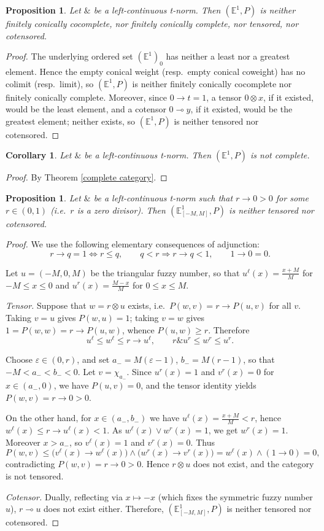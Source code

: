 \documentclass[preprint,3p,times]{elsarticle}
\theoremstyle{plain}
\newtheorem{prop}[thm]{Proposition}
\newtheorem{cor}[thm]{Corollary}
\theoremstyle{definition}
\numberwithin{equation}{section}
\begin{document}
\begin{prop}
Let \(\&\) be a left-continuous t-norm. Then \((\mathbb E^1,P)\) is neither
finitely conically cocomplete, nor finitely conically complete, nor tensored, nor cotensored.
\end{prop}
\begin{proof}
   The underlying ordered set \((\mathbb E^1)_0\) has neither a least nor a
greatest element. Hence the empty conical weight (resp.\ empty conical
coweight) has no colimit (resp.\ limit), so \((\mathbb E^1,P)\) is neither
finitely conically cocomplete nor finitely conically complete. Moreover, since \(0\to t=1\),
a tensor \(0\otimes x\), if it existed, would be the least element, and a
cotensor \(0\multimap y\), if it existed, would be the greatest element;
neither exists, so \((\mathbb E^1,P)\) is neither tensored nor cotensored.
\end{proof}
\begin{cor}
    Let \(\&\) be a left-continuous t-norm. Then \((\mathbb{E}^1,P) \) is not complete.
\end{cor}
\begin{proof}
    By Theorem \ref{complete category}.
\end{proof}
\begin{prop}
Let \(\&\) be a left-continuous t-norm such that \(r\to0>0\) for some
\(r\in(0,1)\) (i.e.\ \(r\) is a zero divisor). Then
\((\mathbb E^1_{[-M,M]},P)\) is neither tensored nor cotensored.
\end{prop}
\begin{proof}
We use the following elementary consequences of adjunction:
\[
r\to q=1\iff r\le q,\qquad q<r\Longrightarrow r\to q<1,\qquad 1\to0=0.
\]

Let \(u=(-M,0,M)\) be the triangular fuzzy number, so that
\(u^\ell(x)=\frac{x+M}{M}\) for \(-M\le x\le0\) and
\(u^r(x)=\frac{M-x}{M}\) for \(0\le x\le M\).

\emph{Tensor.} Suppose that \(w=r\otimes u\) exists, i.e.\
\(P(w,v)=r\to P(u,v)\) for all \(v\). Taking \(v=u\) gives \(P(w,u)=1\);
taking \(v=w\) gives \(1=P(w,w)=r\to P(u,w)\), whence \(P(u,w)\ge r\).
Therefore
\[
u^\ell\le w^\ell\le r\to u^\ell,\qquad
r\mathbin{\&}u^r\le w^r\le u^r.
\]

Choose \(\varepsilon\in(0,r)\), and set
\(a_-=M(\varepsilon-1)\), \(b_-=M(r-1)\), so that
\(-M<a_-<b_-<0\). Let \(v=\chi_{a_-}\). Since \(u^r(x)=1\) and
\(v^r(x)=0\) for \(x\in(a_-,0)\), we have \(P(u,v)=0\), and the tensor
identity yields \(P(w,v)=r\to0>0\).

On the other hand, for \(x\in(a_-,b_-)\) we have
\(u^\ell(x)=\frac{x+M}{M}<r\), hence
\(w^\ell(x)\le r\to u^\ell(x)<1\). As \(w^\ell(x)\vee w^r(x)=1\), we get
\(w^r(x)=1\). Moreover \(x>a_-\), so \(v^\ell(x)=1\) and \(v^r(x)=0\).
Thus
\[
P(w,v)\le\bigl(v^\ell(x)\to w^\ell(x)\bigr)\wedge\bigl(w^r(x)\to v^r(x)\bigr)
=w^\ell(x)\wedge(1\to0)=0,
\]
contradicting \(P(w,v)=r\to0>0\). Hence \(r\otimes u\) does not exist,
and the category is not tensored.

\emph{Cotensor.} Dually, reflecting via \(x\mapsto -x\) (which fixes the
symmetric fuzzy number \(u\)), \(r\multimap u\) does not exist either. Therefore, \((\mathbb E^1_{[-M,M]},P)\) is neither tensored nor cotensored.
\end{proof}
\end{document}
